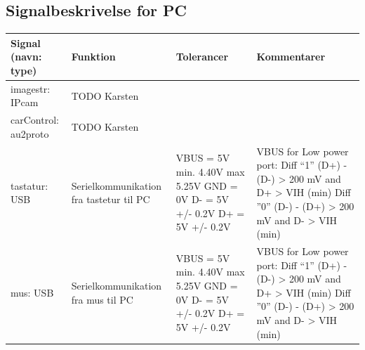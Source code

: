 \subsection{Signalbeskrivelse for PC}

\begin{table}[h]
	\centering
	\begin{tabularx}{\textwidth}{|l|X|X|X|} \hline
	\textbf{Signal (navn: type)} & \textbf{Funktion} & \textbf{Tolerancer} & \textbf{Kommentarer} \\ \hline
imagestr: IPcam
	& TODO Karsten %
	& 
 	& 
	\\ \hline
	
carControl: au2proto
	& TODO Karsten %
	& 
	& 
	\\ \hline
	
tastatur: USB
	& Serielkommunikation fra tastetur til PC 
	& VBUS = 5V min. 4.40V max 5.25V \newline
		GND = 0V \newline
		D- = 5V +/- 0.2V \newline
		D+ = 5V +/- 0.2V \newline
	
	& VBUS for Low power port: \newline
		Diff  “1” \newline
		(D+) - (D-) > 200 mV \newline
		and D+ > VIH (min) \newline
		Diff ”0” \newline
		(D-) - (D+) > 200 mV \newline
		and D- > VIH (min) \newline
	
	\\ \hline	
	
mus: USB
	& Serielkommunikation fra mus til PC 
	& VBUS = 5V min. 4.40V max 5.25V \newline
		GND = 0V \newline
		D- = 5V +/- 0.2V \newline
		D+ = 5V +/- 0.2V \newline

	& VBUS for Low power port: \newline
		Diff  “1” \newline
		(D+) - (D-) > 200 mV \newline
		and D+ > VIH (min) \newline
		Diff ”0” \newline
		(D-) - (D+) > 200 mV \newline
		and D- > VIH (min) \newline


\end{tabularx}
\end{table}
